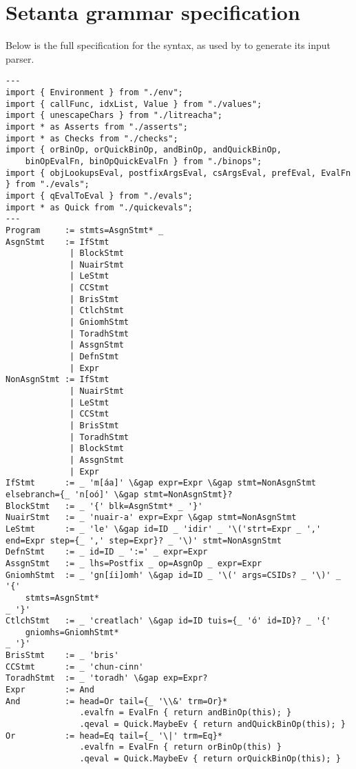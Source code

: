 \chapter{Setanta grammar specification}
\label{appendix:setantagrammar}

Below is the full specification for the \Setanta{} syntax, as used by \tsPEG{} to generate its input parser.
\begin{lstlisting}[language=tspeg, frame=single]
---
import { Environment } from "./env";
import { callFunc, idxList, Value } from "./values";
import { unescapeChars } from "./litreacha";
import * as Asserts from "./asserts";
import * as Checks from "./checks";
import { orBinOp, orQuickBinOp, andBinOp, andQuickBinOp,
    binOpEvalFn, binOpQuickEvalFn } from "./binops";
import { objLookupsEval, postfixArgsEval, csArgsEval, prefEval, EvalFn } from "./evals";
import { qEvalToEval } from "./evals";
import * as Quick from "./quickevals";
---
Program     := stmts=AsgnStmt* _
AsgnStmt    := IfStmt
             | BlockStmt
             | NuairStmt
             | LeStmt
             | CCStmt
             | BrisStmt
             | CtlchStmt
             | GniomhStmt
             | ToradhStmt
             | AssgnStmt
             | DefnStmt
             | Expr
NonAsgnStmt := IfStmt
             | NuairStmt
             | LeStmt
             | CCStmt
             | BrisStmt
             | ToradhStmt
             | BlockStmt
             | AssgnStmt
             | Expr
IfStmt      := _ 'm[áa]' \&gap expr=Expr \&gap stmt=NonAsgnStmt elsebranch={_ 'n[oó]' \&gap stmt=NonAsgnStmt}?
BlockStmt   := _ '{' blk=AsgnStmt* _ '}'
NuairStmt   := _ 'nuair-a' expr=Expr \&gap stmt=NonAsgnStmt
LeStmt      := _ 'le' \&gap id=ID _ 'idir' _ '\('strt=Expr _ ',' end=Expr step={_ ',' step=Expr}? _ '\)' stmt=NonAsgnStmt
DefnStmt    := _ id=ID _ ':=' _ expr=Expr
AssgnStmt   := _ lhs=Postfix _ op=AsgnOp _ expr=Expr
GniomhStmt  := _ 'gn[íi]omh' \&gap id=ID _ '\(' args=CSIDs? _ '\)' _ '{'
    stmts=AsgnStmt*
_ '}'
CtlchStmt   := _ 'creatlach' \&gap id=ID tuis={_ 'ó' id=ID}? _ '{'
    gniomhs=GniomhStmt*
_ '}'
BrisStmt    := _ 'bris'
CCStmt      := _ 'chun-cinn'
ToradhStmt  := _ 'toradh' \&gap exp=Expr?
Expr        := And
And         := head=Or tail={_ '\\&' trm=Or}*
               .evalfn = EvalFn { return andBinOp(this); }
               .qeval = Quick.MaybeEv { return andQuickBinOp(this); }
Or          := head=Eq tail={_ '\|' trm=Eq}*
               .evalfn = EvalFn { return orBinOp(this) }
               .qeval = Quick.MaybeEv { return orQuickBinOp(this); }

\end{lstlisting}
